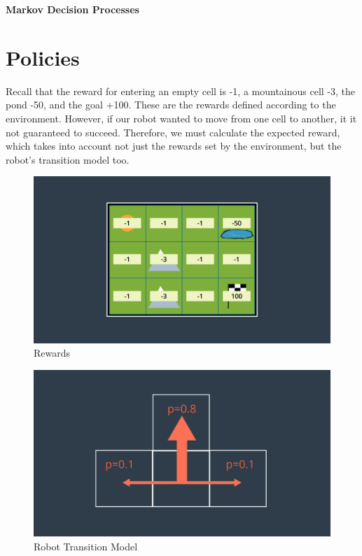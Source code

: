 \documentclass[10pt]{article}
\begin{document}
{\Large \textbf{Markov Decision Processes}}

\section*{\normalsize Policies}

Recall that the reward for entering an empty cell is -1, a mountainous cell -3, the pond -50, and the goal +100. These are the rewards defined according to the environment. However, if our robot wanted to move from one cell to another, it it not guaranteed to succeed. Therefore, we must calculate the expected reward, which takes into account not just the rewards set by the environment, but the robot's transition model too.
	
	\begin{figure}[h!]
		\includegraphics[width=\linewidth]{Images/mdp1.png}
		\caption{Rewards}
	\end{figure}
	
	\begin{figure}[h!]
		\includegraphics[width=\linewidth]{Images/mdp0.png}
		\caption{Robot Transition Model}
	\end{figure}
	
\end{document}
